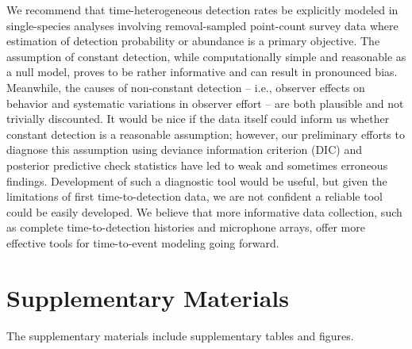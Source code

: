 \documentclass[12pt]{article}
\newcommand{\adam}[1]{{\color{blue} ADAM: #1}}
\newcommand{\pdet}{p^{(det)}}
\begin{document}
We recommend that time-heterogeneous detection rates be explicitly modeled in single-species analyses involving removal-sampled point-count survey data where estimation of detection probability or abundance is a primary objective.  
The assumption of constant detection, while computationally simple and reasonable as a null model, proves to be rather informative and can result in pronounced bias.  
Meanwhile, the causes of non-constant detection -- i.e., observer effects on behavior and systematic variations in observer effort -- are both plausible and not trivially discounted.  
It would be nice if the data itself could inform us whether constant detection is a reasonable assumption; however, our preliminary efforts to diagnose this assumption using deviance information criterion (DIC) and posterior predictive check statistics have led to weak and sometimes erroneous findings.
Development of such a diagnostic tool would be useful, but given the limitations of first time-to-detection data, we are not confident a reliable tool could be easily developed.  
We believe that more informative data collection, such as complete time-to-detection histories and microphone arrays, offer more effective tools for time-to-event modeling going forward.


\section{Supplementary Materials}

The supplementary materials include supplementary tables and figures. 





\end{document}
